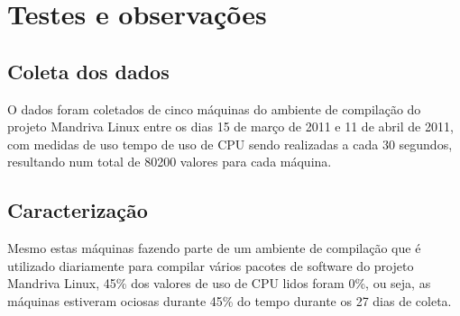 \chapter{Testes e observações}\label{sec:resultados}

\section{Coleta dos dados}

O dados foram coletados de cinco máquinas do ambiente de compilação do
projeto Mandriva Linux entre os dias 15 de março de 2011 e 11 de abril de
2011, com medidas de uso tempo de uso de CPU sendo realizadas a cada 30
segundos, resultando num total de 80200 valores para cada máquina.

\section{Caracterização}

Mesmo estas máquinas fazendo parte de um ambiente de compilação que é
utilizado diariamente para compilar vários pacotes de software do projeto
Mandriva Linux, 45\% dos valores de uso de CPU lidos foram 0\%, ou seja,
as máquinas estiveram ociosas durante 45\% do tempo durante os 27 dias de
coleta.
